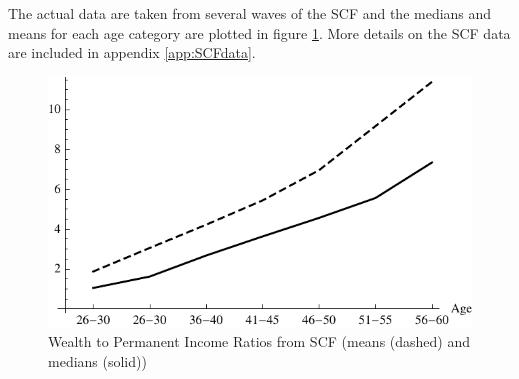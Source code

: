 \documentclass[titlepage, headings=optiontotocandhead]{\econtex}
\begin{document}

The actual data are taken from several waves of the SCF and the medians and means for each age category are plotted in figure \ref{fig:MeanMedianSCF}. More details on the SCF data are included in appendix \ref{app:SCFdata}.
\hypertarget{PlotMeanMedianSCFcollegeGrads}{}
\begin{figure}
  \includegraphics{./Figures/PlotMeanMedianSCFcollegeGrads}
  \caption{Wealth to Permanent Income Ratios from SCF (means (dashed) and medians (solid))}
  \label{fig:MeanMedianSCF}
\end{figure}
\end{document}
